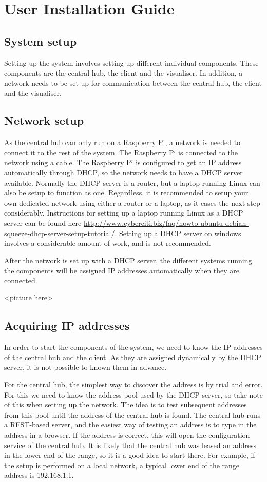 \documentclass[../document.tex]{subfiles}
\begin{document}
\section{User Installation Guide}

\subsection{System setup}
Setting up the system involves setting up different individual components. These components are the central hub, the client and the visualiser. In addition, a network needs to be set up for communication between the central hub, the client and the visualiser.

\subsection{Network setup}
As the central hub can only run on a Raspberry Pi, a network is needed to connect it to the rest of the system. The Raspberry Pi is connected to the network using a cable. The Raspberry Pi is configured to get an IP address automatically through DHCP, so the network needs to have a DHCP server available. Normally the DHCP server is a router, but a laptop running Linux can also be setup to function as one. Regardless, it is recommended to setup your own dedicated network using either a router or a laptop, as it eases the next step considerably. Instructions for setting up a laptop running Linux as a DHCP server can be found here \url{http://www.cyberciti.biz/faq/howto-ubuntu-debian-squeeze-dhcp-server-setup-tutorial/}.
Setting up a DHCP server on windows involves a considerable amount of work, and is not recommended.

After the network is set up with a DHCP server, the different systems running the components will be assigned IP addresses automatically when they are connected.

{\color{red} <picture here>}

\subsection{Acquiring IP addresses}
In order to start the components of the system, we need to know the IP addresses of the central hub and the client. As they are assigned dynamically by the DHCP server, it is not possible to known them in advance.

For the central hub, the simplest way to discover the address is by trial and error. For this we need to know the address pool used by the DHCP server, so take note of this when setting up the network. The idea is to test subsequent addresses from this pool until the address of the central hub is found. The central hub runs a REST-based server, and the easiest way of testing an address is to type in the address in a browser. If the address is correct, this will open the configuration service of the central hub. It is likely that the central hub was leased an address in the lower end of the range, so it is a good idea to start there. For example, if the setup is performed on a local network, a typical lower end of the range address is 192.168.1.1.
\end{document}
